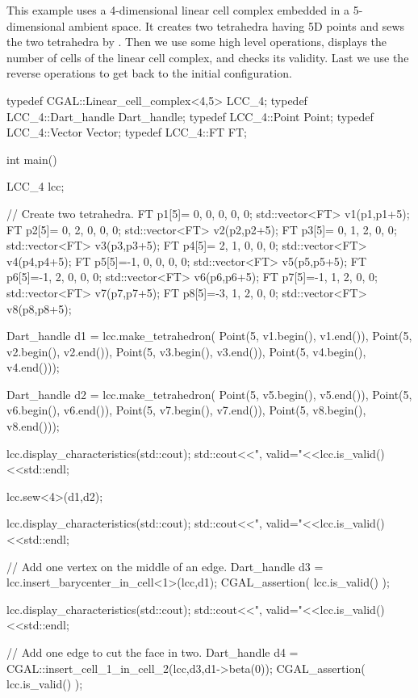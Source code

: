 This example uses a 4-dimensional linear cell complex embedded in a
5-dimensional ambient space.  It creates two tetrahedra having 5D
points and sews the two tetrahedra by \betaquatre{}. Then we use some high
level operations, displays the number of cells of the linear cell
complex, and checks its validity.  Last we use the reverse operations
to get back to the initial configuration.

\begin{ccExampleCode}
typedef CGAL::Linear_cell_complex<4,5> LCC_4;
typedef LCC_4::Dart_handle Dart_handle;
typedef LCC_4::Point Point;
typedef LCC_4::Vector Vector;
typedef LCC_4::FT FT;

int main()
{
  LCC_4 lcc;
	
  // Create two tetrahedra.
  FT p1[5]={ 0, 0, 0, 0, 0}; std::vector<FT> v1(p1,p1+5);
  FT p2[5]={ 0, 2, 0, 0, 0}; std::vector<FT> v2(p2,p2+5);
  FT p3[5]={ 0, 1, 2, 0, 0}; std::vector<FT> v3(p3,p3+5);
  FT p4[5]={ 2, 1, 0, 0, 0}; std::vector<FT> v4(p4,p4+5);
  FT p5[5]={-1, 0, 0, 0, 0}; std::vector<FT> v5(p5,p5+5);
  FT p6[5]={-1, 2, 0, 0, 0}; std::vector<FT> v6(p6,p6+5);
  FT p7[5]={-1, 1, 2, 0, 0}; std::vector<FT> v7(p7,p7+5);
  FT p8[5]={-3, 1, 2, 0, 0}; std::vector<FT> v8(p8,p8+5);
  
  Dart_handle d1 = lcc.make_tetrahedron(
                      Point(5, v1.begin(), v1.end()),
                      Point(5, v2.begin(), v2.end()),
                      Point(5, v3.begin(), v3.end()),
                      Point(5, v4.begin(), v4.end()));  
  
  Dart_handle d2 = lcc.make_tetrahedron(
                      Point(5, v5.begin(), v5.end()),
                      Point(5, v6.begin(), v6.end()),
                      Point(5, v7.begin(), v7.end()),
                      Point(5, v8.begin(), v8.end()));

  lcc.display_characteristics(std::cout);
  std::cout<<", valid="<<lcc.is_valid()<<std::endl;

  lcc.sew<4>(d1,d2);
  
  lcc.display_characteristics(std::cout);
  std::cout<<", valid="<<lcc.is_valid()<<std::endl;

  // Add one vertex on the middle of an edge.
  Dart_handle d3 = lcc.insert_barycenter_in_cell<1>(lcc,d1);
  CGAL_assertion( lcc.is_valid() );

  lcc.display_characteristics(std::cout);
  std::cout<<", valid="<<lcc.is_valid()<<std::endl;

  // Add one edge to cut the face in two.
  Dart_handle d4 = CGAL::insert_cell_1_in_cell_2(lcc,d3,d1->beta(0));
  CGAL_assertion( lcc.is_valid() );
	
}
\end{ccExampleCode}

